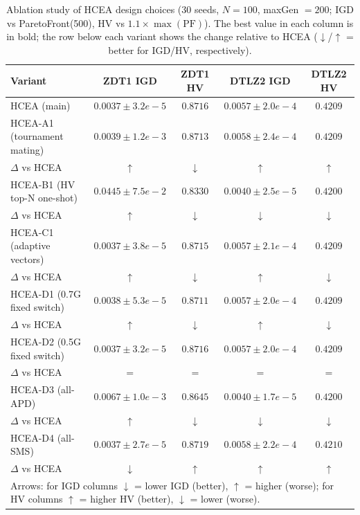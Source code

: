 \begin{table}[t]
\centering
\caption{Ablation study of HCEA design choices (30 seeds, $N=100$, maxGen $=200$; IGD vs ParetoFront(500), HV vs $1.1\times\max(\mathrm{PF})$). The best value in each column is in bold; the row below each variant shows the change relative to HCEA ($\downarrow$/$\uparrow$ = better for IGD/HV, respectively).}
\label{tab:ablation}
\begin{tabular}{lcccc}
\toprule
Variant & ZDT1 IGD & ZDT1 HV & DTLZ2 IGD & DTLZ2 HV \\
\midrule
HCEA (main) & $0.0037 \pm 3.2e-5$ & $0.8716$ & $0.0057 \pm 2.0e-4$ & $0.4209$ \\
HCEA-A1 (tournament mating) & $0.0039 \pm 1.2e-3$ & $0.8713$ & $0.0058 \pm 2.4e-4$ & $0.4209$ \\
\hspace{1.4em}$\Delta$ vs HCEA & $\uparrow$ & $\downarrow$ & $\uparrow$ & $\uparrow$ \\
HCEA-B1 (HV top-N one-shot) & $0.0445 \pm 7.5e-2$ & $0.8330$ & $0.0040 \pm 2.5e-5$ & $0.4200$ \\
\hspace{1.4em}$\Delta$ vs HCEA & $\uparrow$ & $\downarrow$ & $\downarrow$ & $\downarrow$ \\
HCEA-C1 (adaptive vectors) & $0.0037 \pm 3.8e-5$ & $0.8715$ & $0.0057 \pm 2.1e-4$ & $0.4209$ \\
\hspace{1.4em}$\Delta$ vs HCEA & $\uparrow$ & $\downarrow$ & $\uparrow$ & $\downarrow$ \\
HCEA-D1 (0.7G fixed switch) & $0.0038 \pm 5.3e-5$ & $0.8711$ & $0.0057 \pm 2.0e-4$ & $0.4209$ \\
\hspace{1.4em}$\Delta$ vs HCEA & $\uparrow$ & $\downarrow$ & $\uparrow$ & $\downarrow$ \\
HCEA-D2 (0.5G fixed switch) & $0.0037 \pm 3.2e-5$ & $0.8716$ & $0.0057 \pm 2.0e-4$ & $0.4209$ \\
\hspace{1.4em}$\Delta$ vs HCEA & $=$ & $=$ & $=$ & $=$ \\
HCEA-D3 (all-APD) & $0.0067 \pm 1.0e-3$ & $0.8645$ & \textbf{$0.0040 \pm 1.7e-5$} & $0.4200$ \\
\hspace{1.4em}$\Delta$ vs HCEA & $\uparrow$ & $\downarrow$ & $\downarrow$ & $\downarrow$ \\
HCEA-D4 (all-SMS) & \textbf{$0.0037 \pm 2.7e-5$} & \textbf{$0.8719$} & $0.0058 \pm 2.2e-4$ & \textbf{$0.4210$} \\
\hspace{1.4em}$\Delta$ vs HCEA & $\downarrow$ & $\uparrow$ & $\uparrow$ & $\uparrow$ \\
\midrule
\multicolumn{5}{l}{\footnotesize Arrows: for IGD columns $\downarrow$ = lower IGD (better), $\uparrow$ = higher (worse); for HV columns $\uparrow$ = higher HV (better), $\downarrow$ = lower (worse).}\\
\bottomrule
\end{tabular}
\end{table}
